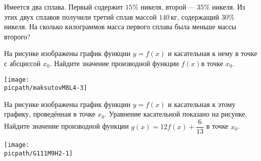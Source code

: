 \begin{homework}[number=2]
\begin{listofex}
		\item Имеется два сплава. Первый содержит \(15\%\) никеля, второй --- \(35\%\) никеля. Из этих двух сплавов получили третий сплав массой \(140\) кг, содержащий \(30\%\) никеля. На сколько килограммов масса первого сплава была меньше массы второго?
		\item
		\begin{minipage}[t]{\bodywidth}
			На рисунке изображены график функции \(y=f(x)\) и касательная к нему в точке с абсциссой \(x_0\). Найдите значение производной функции \(f(x)\)в точке \(x_0\).
		\end{minipage}
		\hspace{0.02\linewidth}
		\begin{minipage}[t]{\picwidth}
			\texttt{[image: \\picpath/maksutovM8L4-3]}
		\end{minipage}
		\item
		\begin{minipage}[t]{0.45\linewidth}
			На рисунке изображены график функции \(y=f(x)\) и касательная к этому графику, проведённая в точке \(x_0\). Уравнение касательной показано на рисунке. Найдите значение производной функции \(g(x)=12f(x)+\dfrac{  6}{13  }\) в точке \(x_0\).
		\end{minipage}
		\hspace{0.02\linewidth}
		\begin{minipage}[t]{0.5\linewidth}
			\texttt{[image: \\picpath/G111M9H2-1]}
		\end{minipage}

\end{listofex}
\end{homework}

